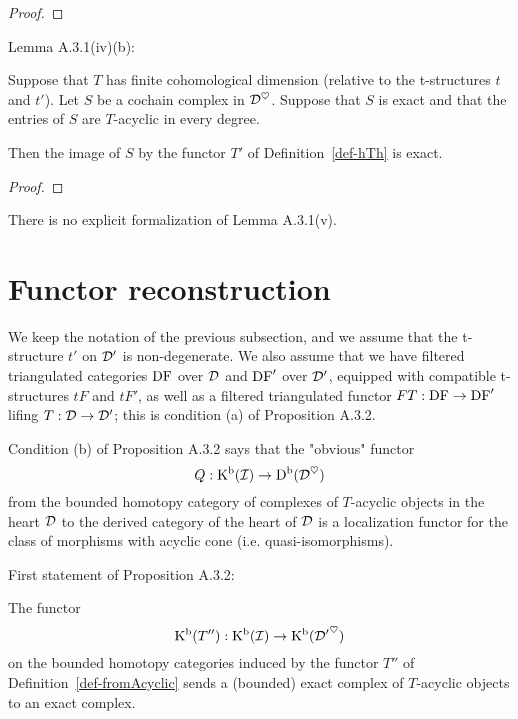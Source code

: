 \begin{proof}
\leanok
\end{proof}


Lemma A.3.1(iv)(b):

\begin{lemma}
\label{prop-exact_map_of_exact_acyclic_complex_and_bounded_functor}
\leanok 
{}
Suppose that $T$ has finite cohomological dimension (relative to the t-structures $t$ and $t'$).
Let $S$ be a cochain complex in $\mathcal{D}^\heartsuit$.
Suppose that $S$ is exact  and that
the entries of $S$ are $T$-acyclic in every degree.

Then the image of $S$ by the functor $T'$ of Definition~\ref{def-hTh} is exact.

\end{lemma}

\begin{proof}
\leanok
\end{proof}


There is no explicit formalization of Lemma A.3.1(v).


\section{Functor reconstruction}

We keep the notation of the previous subsection, and we assume that the t-structure $t'$ on $\mathcal{D}'$ is 
non-degenerate. We also assume that we have filtered triangulated categories $\operatorname{DF}$ over $\mathcal{D}$ and 
$\operatorname{DF}'$ over $\mathcal{D}'$, equipped with compatible t-structures $tF$ and $tF'$, as well as a filtered triangulated 
functor $FT:\operatorname{DF}\to\operatorname{DF}'$ lifing $T:\mathcal{D}\to\mathcal{D}'$; this is condition (a) of Proposition A.3.2.

Condition (b) of Proposition A.3.2 says that the "obvious" functor 
\[Q:\operatorname{\mathrm{K}^b}(\mathcal{I}) \to \operatorname{\mathrm{D}^b}(\mathcal{D}^\heartsuit)\]
from the bounded homotopy category of
complexes of $T$-acyclic objects in the heart $\mathcal{D}$ to the derived category of the heart of $\mathcal{D}$
is a localization functor for the class of morphisms with acyclic cone (i.e. quasi-isomorphisms).

First statement of Proposition A.3.2:
\begin{proposition}
\label{prop-AcyclicComplexAcyclic_image}
\leanok 
{}

The functor 
\[\operatorname{\mathrm{K}^b}(T''):\operatorname{\mathrm{K}^b}(\mathcal{I})\to\operatorname{\mathrm{K}^b}({\mathcal{D}'}^\heartsuit)\]
on the bounded homotopy categories induced by the functor $T''$ of 
Definition~\ref{def-fromAcyclic}
sends a (bounded) exact complex of $T$-acyclic objects to an exact complex.

\end{proposition}

